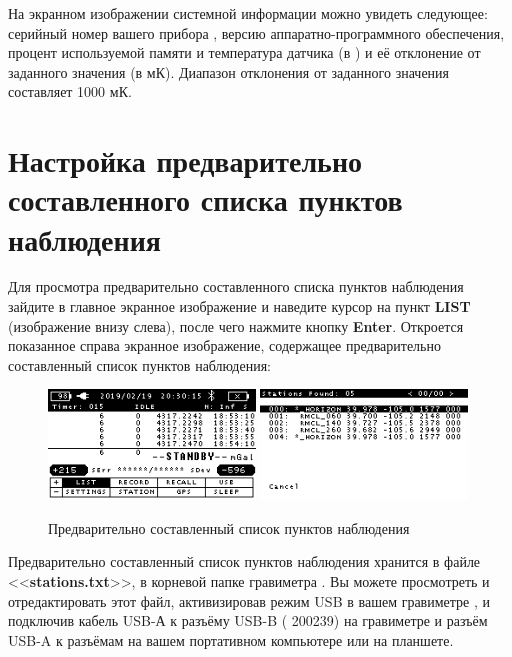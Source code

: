 На экранном изображении системной информации можно увидеть следующее: серийный
номер вашего прибора \cg{}, версию аппаратно-программного обеспечения, процент
используемой памяти и температура датчика (в \textcelsius{}) и её отклонение от
заданного значения (в мК). Диапазон отклонения от заданного значения составляет
\textpm{}1000 мК.


\section{Настройка предварительно составленного списка пунктов наблюдения}
\label{sec:setting_up_the_pre-set_list_of_stations}

Для просмотра предварительно составленного списка пунктов наблюдения зайдите в
главное экранное изображение и наведите курсор на пункт \textbf{LIST}
(изображение внизу слева), после чего нажмите кнопку \textbf{Enter}. Откроется
показанное справа экранное изображение, содержащее предварительно составленный
список пунктов наблюдения:

\newpage
\begin{figure}[H]
  \centering
  \includegraphics[width=0.49\textwidth]{figures/pre-set_list_of_stations_1}
  \includegraphics[width=0.49\textwidth]{figures/pre-set_list_of_stations_2}
  \caption{Предварительно составленный список пунктов наблюдения}
  \label{fig:pre-set_list_of_stations}
\end{figure}

Предварительно составленный список пунктов наблюдения хранится в файле
<<\textbf{stations.txt}>>, в корневой папке гравиметра \cg{}. Вы можете
просмотреть и отредактировать этот файл, активизировав режим USB в вашем
гравиметре \cg{}, и подключив кабель USB-А к разъёму USB-B (\textnumero{} 200239)
на гравиметре \cg{} и разъём USB-A к разъёмам на вашем портативном компьютере или
на планшете.

